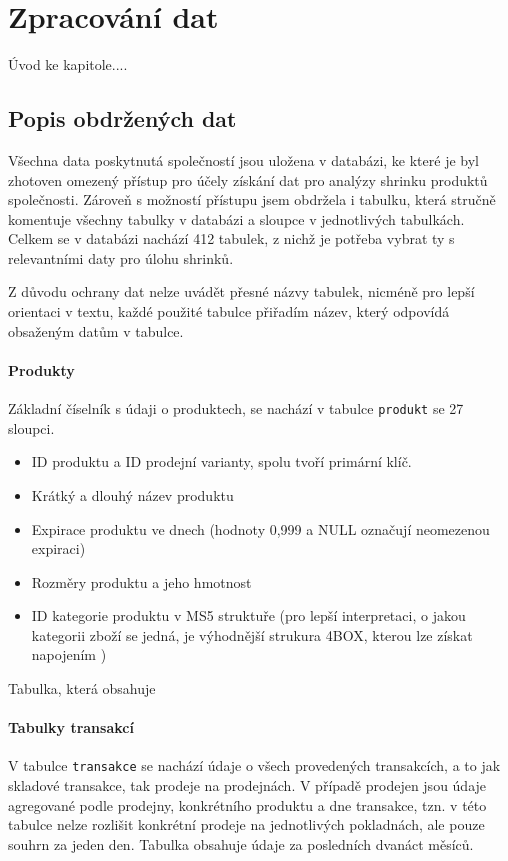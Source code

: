 \chapter{Zpracování dat}

Úvod ke kapitole.... %

\section{Popis obdržených dat}

Všechna data poskytnutá společností jsou uložena v databázi, ke které je byl zhotoven omezený přístup pro účely získání dat pro analýzy shrinku produktů společnosti. Zároveň s možností přístupu jsem obdržela i tabulku, která stručně komentuje všechny tabulky v databázi a sloupce v jednotlivých tabulkách. Celkem se v databázi nachází 412 tabulek, z nichž je potřeba vybrat ty s relevantními daty pro úlohu shrinků.

Z důvodu ochrany dat nelze uvádět přesné názvy tabulek, nicméně pro lepší orientaci v textu, každé použité tabulce přiřadím název, který odpovídá obsaženým datům v tabulce.

\subsubsection{Produkty}

Základní číselník s údaji o produktech, se nachází v tabulce \texttt{produkt} se 27 sloupci. 
\begin{itemize}
    \item ID produktu a ID prodejní varianty, spolu tvoří primární klíč. 
    \item Krátký a dlouhý název produktu
    \item Expirace produktu ve dnech (hodnoty 0,999 a NULL označují neomezenou expiraci)
    \item Rozměry produktu a jeho hmotnost
    \item ID kategorie produktu v MS5 struktuře (pro lepší interpretaci, o jakou kategorii zboží se jedná, je výhodnější strukura 4BOX, kterou lze získat napojením )
\end{itemize}

Tabulka, která obsahuje 

\subsubsection{Tabulky transakcí}
V tabulce \texttt{transakce} se nachází údaje o všech provedených transakcích, a to jak skladové transakce, tak prodeje na prodejnách. V případě prodejen jsou údaje agregované podle prodejny, konkrétního produktu a dne transakce, tzn. v této tabulce nelze rozlišit konkrétní prodeje na jednotlivých pokladnách, ale pouze souhrn za jeden den. Tabulka obsahuje údaje za posledních dvanáct měsíců.

